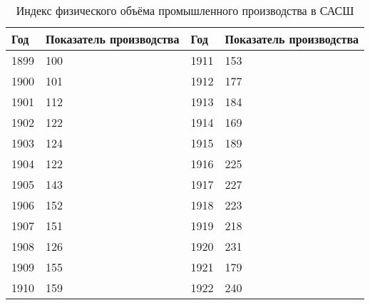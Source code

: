 \documentclass[leqno]{article}  %
\begin{document}
\begin{table}
\centering
\footnotesize{
\caption{Индекс физического объёма промышленного производства в САСШ}%
\label{tab4}%
\begin{tabular}{p{}|p{}||p{}|p{}}
\hline
Год & Показатель производства & Год & Показатель производства \\
\hline
1899 & \hfill 100 & \hspace*{2.5mm} 1911 & \hfill 153 \hspace*{2.5mm} \\
1900 & \hfill 101 & \hspace*{2.5mm} 1912 & \hfill 177 \hspace*{2.5mm} \\
1901 & \hfill 112 & \hspace*{2.5mm} 1913 & \hfill 184 \hspace*{2.5mm} \\
1902 & \hfill 122 & \hspace*{2.5mm} 1914 & \hfill 169 \hspace*{2.5mm} \\
1903 & \hfill 124 & \hspace*{2.5mm} 1915 & \hfill 189 \hspace*{2.5mm} \\
1904 & \hfill 122 & \hspace*{2.5mm} 1916 & \hfill 225 \hspace*{2.5mm} \\
1905 & \hfill 143 & \hspace*{2.5mm} 1917 & \hfill 227 \hspace*{2.5mm} \\
1906 & \hfill 152 & \hspace*{2.5mm} 1918 & \hfill 223 \hspace*{2.5mm} \\
1907 & \hfill 151 & \hspace*{2.5mm} 1919 & \hfill 218 \hspace*{2.5mm} \\
1908 & \hfill 126 & \hspace*{2.5mm} 1920 & \hfill 231 \hspace*{2.5mm} \\
1909 & \hfill 155 & \hspace*{2.5mm} 1921 & \hfill 179 \hspace*{2.5mm} \\
1910 & \hfill 159 & \hspace*{2.5mm} 1922 & \hfill 240 \hspace*{2.5mm} \\
\hline
\end{tabular}
}
\end{table}
\end{document}
